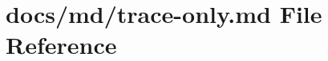 \hypertarget{trace-only_8md}{}\section{docs/md/trace-\/only.md File Reference}
\label{trace-only_8md}
